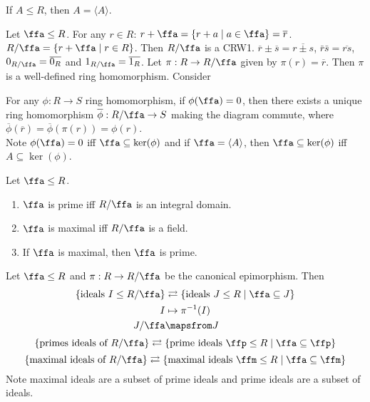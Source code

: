 \begin{example}
    If $A \leq R$, then $A = \langle A \rangle$.
\end{example}

\begin{remark}[Construction]
    Let $\ffa \leq R$. For any $r \in R$: $r+\ffa = \{r + a \mid a \in \ffa\} = \overline r$. $R/\ffa = \{r + \ffa \mid r \in R\}$. Then $R/\ffa$ is a CRW1. $\overline r \pm \overline s = \overline {r \pm s}$, $\bar r \bar s = \overline{rs}$, $0_{R/\ffa} = \overline {0_R}$ and $1_{R/\ffa} = \overline {1_R}$. Let $\pi: R \to R/\ffa$ given by $\pi(r) = \overline r$. Then $\pi$ is a well-defined ring homomorphism. Consider
    \begin{center}
    \end{center}
    For any $\phi: R \to S$ ring homomorphism, if $\phi(\ffa) = 0$, then there exists a unique ring homomorphism $\overline \phi: R/\ffa \to S$ making the diagram commute, where $\overline \phi(\overline r) = \overline \phi (\pi(r)) = \phi(r)$. \\
    Note $\phi(\ffa) = 0$ iff $\ffa \subseteq \ker(\phi)$ and if $\ffa = \langle A \rangle$, then $\ffa \subseteq \ker(\phi)$ iff $A \subseteq \ker(\phi)$.
\end{remark}

\begin{remark}[Fact]
    Let $\ffa \leq R$. 
    \begin{enumerate}[(1)]
        \item $\ffa$ is prime iff $R/\ffa$ is an integral domain.
        \item $\ffa$ is maximal iff $R/\ffa$ is a field.
        \item If $\ffa$ is maximal, then $\ffa$ is prime.
    \end{enumerate}
\end{remark}

\begin{theorem}
    Let $\ffa \leq R$ and $\pi: R \to R/\ffa$ be the canonical epimorphism. Then 
    \begin{align*}
        \{\text{ideals }I \leq R/\ffa\} &\rightleftarrows \{\text{ideals }J \leq R \mid \ffa \subseteq J\} \\
        I &\mapsto \pi^{-1}(I) \\
        J/\ffa &\mapsfrom J
    \end{align*}
    \[ \{\text{primes ideals of } R/\ffa\} \rightleftarrows \{\text{prime ideals }\ffp \leq R \mid \ffa \subseteq \ffp\} \]
    \[ \{\text{maximal ideals of } R/\ffa\} \rightleftarrows \{\text{maximal ideals }\ffm \leq R \mid \ffa \subseteq \ffm\} \]
    Note maximal ideals are a subset of prime ideals and prime ideals are a subset of ideals.
\end{theorem}

